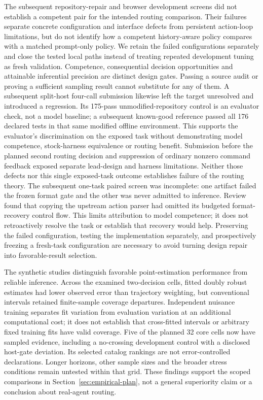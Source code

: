 The subsequent repository-repair and browser development screens did not establish a competent pair for
the intended routing comparison. Their failures separate concrete configuration and interface defects
from persistent action-loop limitations, but do not identify how a competent history-aware policy compares
with a matched prompt-only policy. We retain the failed configurations separately and close the tested
local paths instead of treating repeated development tuning as fresh validation. Competence, consequential
decision opportunities and attainable inferential precision are distinct design gates. Passing a source
audit or proving a sufficient sampling result cannot substitute for any of them.
A subsequent split-host four-call submission likewise left the target unresolved and introduced a
regression. Its 175-pass unmodified-repository control is an evaluator check, not a model baseline;
a subsequent known-good reference passed all 176 declared tests in that same modified offline
environment. This supports the evaluator's discrimination on the exposed task without demonstrating
model competence, stock-harness equivalence or routing benefit. Submission before the planned second
routing decision and suppression of ordinary
nonzero command feedback exposed separate lead-design and harness limitations. Neither those defects
nor this single exposed-task outcome establishes failure of the routing theory.
The subsequent one-task paired screen was incomplete: one artifact failed the frozen format gate
and the other was never admitted to inference. Review found that copying the upstream action parser
had omitted its budgeted format-recovery control flow. This limits attribution to model competence;
it does not retroactively resolve the task or establish that recovery would help. Preserving the
failed configuration, testing the implementation separately, and prospectively freezing a fresh-task
configuration are necessary to avoid turning design repair into favorable-result selection.

The synthetic studies distinguish favorable point-estimation performance from reliable inference. Across the
examined two-decision cells, fitted doubly robust estimates had lower observed error than trajectory weighting,
but conventional intervals retained finite-sample coverage departures. Independent nuisance training separates
fit variation from evaluation variation at an additional computational cost; it does not establish that
cross-fitted intervals or arbitrary fixed training fits have valid coverage. Five of the planned 32 core
cells now have sampled evidence, including a no-crossing development control with a disclosed
host-gate deviation. Its selected catalog rankings are not error-controlled declarations.
Longer horizons, other sample sizes and the broader stress conditions remain
untested within that grid. These findings support the scoped comparisons in Section~\ref{sec:empirical-plan},
not a general superiority claim or a conclusion about real-agent routing.

